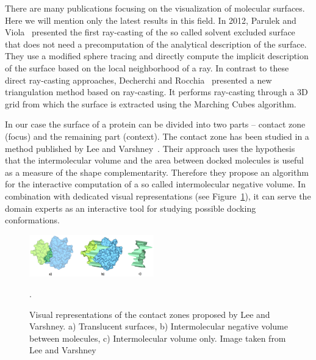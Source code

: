 \documentclass[11pt,a4paper,titlepage,oneside,onecolumn]{article}
\begin{document}
There are many publications focusing on the visualization of molecular surfaces.
Here we will mention only the latest results in this field.
In 2012, Parulek and Viola~\cite{ParulekViola2012} presented the first ray-casting of the so called solvent excluded surface that does not need a precomputation of the analytical description of the surface.
They use a modified sphere tracing and directly compute the implicit description of the surface based on the local neighborhood of a ray.   
In contrast to these direct ray-casting approaches, Decherchi and Rocchia~\cite{Decherchi2013} presented a new triangulation method based on ray-casting. 
It performs ray-casting through a 3D grid from which the surface is extracted using the Marching Cubes algorithm. 


In our case the surface of a protein can be divided into two parts -- contact zone (focus) and the remaining part (context). 
The contact zone has been studied in a method published by Lee and Varshney~\cite{Lee2006}. 
Their approach uses the hypothesis that the intermolecular volume and the area between docked molecules is useful as a measure of the shape complementarity. 
Therefore they propose an algorithm for the interactive computation of a so called intermolecular negative volume. In combination with dedicated visual representations (see Figure~\ref{fig:varshney}), it can serve the domain experts as an interactive tool for studying possible docking conformations.

\setlength\intextsep{0pt}
\begin{figure}
\vspace{-5mm}
  \begin{center}
  \includegraphics[width=0.48\textwidth]{pics/varshney2.png}
	\end{center}
\vspace{-5mm}
  \caption{Visual representations of the contact zones proposed by Lee and Varshney. a) Translucent surfaces, b) Intermolecular negative volume between molecules, c) Intermolecular volume only. Image taken from Lee and Varshney~\cite{Lee2006}}.
  \label{fig:varshney}
\end{figure}
\end{document}
